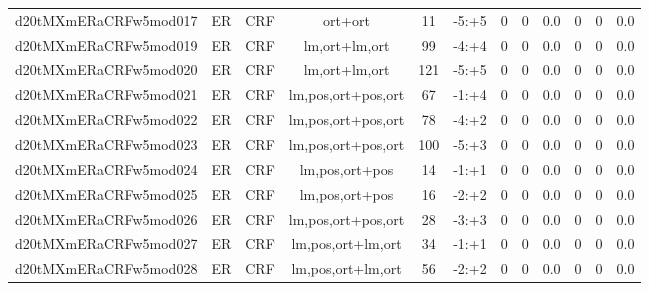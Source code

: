 \documentclass[a4paper]{article}
\begin{document}
\begin{landscape}
\begin{center}
\begin{tabular}{ |c|c|c|c|c|c|c|c|c|c|c|c|}
 	\small{ d20tMXmERaCRFw5mod017 } & ER & CRF & ort+ort  &  11 &  -5:+5  &  0 & 0 & 0.0  &  0 & 0 & 0.0 \\
 	

 
 	
 	\small{ d20tMXmERaCRFw5mod019 } & ER & CRF & lm,ort+lm,ort  &  99 &  -4:+4  &  0 & 0 & 0.0  &  0 & 0 & 0.0 \\
 	

 
 	
 	\small{ d20tMXmERaCRFw5mod020 } & ER & CRF & lm,ort+lm,ort  &  121 &  -5:+5  &  0 & 0 & 0.0  &  0 & 0 & 0.0 \\
 	

 
 	
 	\small{ d20tMXmERaCRFw5mod021 } & ER & CRF & lm,pos,ort+pos,ort  &  67 &  -1:+4  &  0 & 0 & 0.0  &  0 & 0 & 0.0 \\
 	

 
 	
 	\small{ d20tMXmERaCRFw5mod022 } & ER & CRF & lm,pos,ort+pos,ort  &  78 &  -4:+2  &  0 & 0 & 0.0  &  0 & 0 & 0.0 \\
 	

 
 	
 	\small{ d20tMXmERaCRFw5mod023 } & ER & CRF & lm,pos,ort+pos,ort  &  100 &  -5:+3  &  0 & 0 & 0.0  &  0 & 0 & 0.0 \\
 	

 
 	
 	\small{ d20tMXmERaCRFw5mod024 } & ER & CRF & lm,pos,ort+pos  &  14 &  -1:+1  &  0 & 0 & 0.0  &  0 & 0 & 0.0 \\
 	

 
 	
 	\small{ d20tMXmERaCRFw5mod025 } & ER & CRF & lm,pos,ort+pos  &  16 &  -2:+2  &  0 & 0 & 0.0  &  0 & 0 & 0.0 \\
 	

 
 	
 	\small{ d20tMXmERaCRFw5mod026 } & ER & CRF & lm,pos,ort+pos,ort  &  28 &  -3:+3  &  0 & 0 & 0.0  &  0 & 0 & 0.0 \\
 	

 
 	
 	\small{ d20tMXmERaCRFw5mod027 } & ER & CRF & lm,pos,ort+lm,ort  &  34 &  -1:+1  &  0 & 0 & 0.0  &  0 & 0 & 0.0 \\
 	

 
 	
 	\small{ d20tMXmERaCRFw5mod028 } & ER & CRF & lm,pos,ort+lm,ort  &  56 &  -2:+2  &  0 & 0 & 0.0  &  0 & 0 & 0.0 \\
 	


\end{tabular}
\end{center}
\end{landscape}
\end{document}
